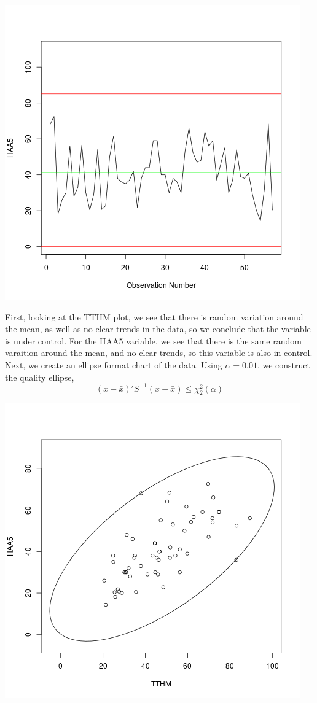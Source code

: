 \documentclass[letterpaper,10pt]{article}
\begin{document}
\begin{enumerate}
\begin{center}
\includegraphics[scale=.5]{haa5xbar.png}
\end{center}
First, looking at the TTHM plot, we see that there is random variation around the mean, as well as no clear trends in the data, so we conclude that the variable is under control. For the HAA5 variable, we see that there is the same random varaition around the mean, and no clear trends, so this variable is also in control. \\
Next, we create an ellipse format chart of the data. Using $\alpha=0.01$, we construct the quality ellipse,
\[(x-\bar{x})'S^{-1}(x-\bar{x})\leq \chi_2^2(\alpha)\]
\begin{center}
\includegraphics[scale=.75]{waterelip.png}

\end{center}
\end{enumerate}
\end{document}
